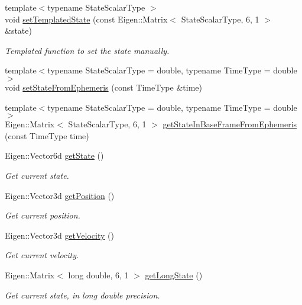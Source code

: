 \begin{DoxyCompactItemize}
{\footnotesize template$<$typename State\+Scalar\+Type $>$ }\\void \hyperlink{classtudat_1_1simulation__setup_1_1Body_ab56fa0e8697fbb2dab1943d36fb7d493}{set\+Templated\+State} (const Eigen\+::\+Matrix$<$ State\+Scalar\+Type, 6, 1 $>$ \&state)
\begin{DoxyCompactList}\small\item\em Templated function to set the state manually. \end{DoxyCompactList}\item 
{\footnotesize template$<$typename State\+Scalar\+Type  = double, typename Time\+Type  = double$>$ }\\void \hyperlink{classtudat_1_1simulation__setup_1_1Body_a2f2cfc32c8e5b257b352809d623b2985}{set\+State\+From\+Ephemeris} (const Time\+Type \&time)
\item 
{\footnotesize template$<$typename State\+Scalar\+Type  = double, typename Time\+Type  = double$>$ }\\Eigen\+::\+Matrix$<$ State\+Scalar\+Type, 6, 1 $>$ \hyperlink{classtudat_1_1simulation__setup_1_1Body_a4ad52e0fbd714ebd2494d65005a8da5e}{get\+State\+In\+Base\+Frame\+From\+Ephemeris} (const Time\+Type time)
\item 
Eigen\+::\+Vector6d \hyperlink{classtudat_1_1simulation__setup_1_1Body_ae4541711e56e09272916448030882fc9}{get\+State} ()
\begin{DoxyCompactList}\small\item\em Get current state. \end{DoxyCompactList}\item 
Eigen\+::\+Vector3d \hyperlink{classtudat_1_1simulation__setup_1_1Body_a595498359521268dbeedc902953a0633}{get\+Position} ()
\begin{DoxyCompactList}\small\item\em Get current position. \end{DoxyCompactList}\item 
Eigen\+::\+Vector3d \hyperlink{classtudat_1_1simulation__setup_1_1Body_ad043093286bc331c63cefbeba4fa17d8}{get\+Velocity} ()
\begin{DoxyCompactList}\small\item\em Get current velocity. \end{DoxyCompactList}\item 
Eigen\+::\+Matrix$<$ long double, 6, 1 $>$ \hyperlink{classtudat_1_1simulation__setup_1_1Body_ab7c0bcfab31d20e5c203da1f92b90792}{get\+Long\+State} ()
\begin{DoxyCompactList}\small\item\em Get current state, in long double precision. \end{DoxyCompactList}\item 

\end{DoxyCompactItemize}
